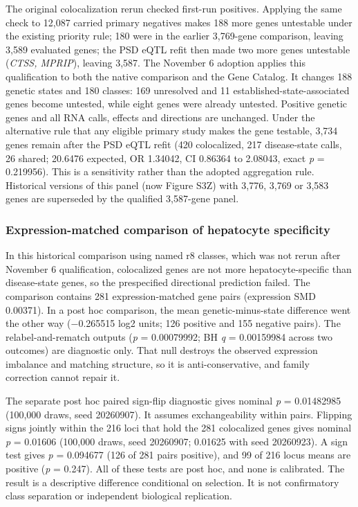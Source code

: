 The original colocalization rerun checked first-run positives. Applying the same check to 12,087 carried primary negatives makes 188 more genes untestable under the existing priority rule; 180 were in the earlier 3,769-gene comparison, leaving 3,589 evaluated genes; the PSD eQTL refit then made two more genes untestable (\emph{CTSS, MPRIP}), leaving 3,587. The November 6 adoption applies this qualification to both the native comparison and the Gene Catalog. It changes 188 genetic states and 180 classes: 169 unresolved and 11 established-state-associated genes become untested, while eight genes were already untested. Positive genetic genes and all RNA calls, effects and directions are unchanged. Under the alternative rule that any eligible primary study makes the gene testable, 3,734 genes remain after the PSD eQTL refit (420 colocalized, 217 disease-state calls, 26 shared; 20.6476 expected, OR 1.34042, CI 0.86364 to 2.08043, exact \emph{p} = 0.219956). This is a sensitivity rather than the adopted aggregation rule. Historical versions of this panel (now Figure S3Z) with 3,776, 3,769 or 3,583 genes are superseded by the qualified 3,587-gene panel.

\subsubsection{Expression-matched comparison of hepatocyte specificity}\label{expression-matched-comparison-of-hepatocyte-specificity}

In this historical comparison using named r8 classes, which was not rerun after November 6 qualification, colocalized genes are not more hepatocyte-specific than disease-state genes, so the prespecified directional prediction failed. The comparison contains 281 expression-matched gene pairs (expression SMD 0.00371). In a post hoc comparison, the mean genetic-minus-state difference went the other way (−0.265515 log2 units; 126 positive and 155 negative pairs). The relabel-and-rematch outputs (\emph{p} = 0.00079992; BH \emph{q} = 0.00159984 across two outcomes) are diagnostic only. That null destroys the observed expression imbalance and matching structure, so it is anti-conservative, and family correction cannot repair it.

The separate post hoc paired sign-flip diagnostic gives nominal \emph{p} = 0.01482985 (100,000 draws, seed 20260907). It assumes exchangeability within pairs. Flipping signs jointly within the 216 loci that hold the 281 colocalized genes gives nominal \emph{p} = 0.01606 (100,000 draws, seed 20260907; 0.01625 with seed 20260923). A sign test gives \emph{p} = 0.094677 (126 of 281 pairs positive), and 99 of 216 locus means are positive (\emph{p} = 0.247). All of these tests are post hoc, and none is calibrated. The result is a descriptive difference conditional on selection. It is not confirmatory class separation or independent biological replication.

